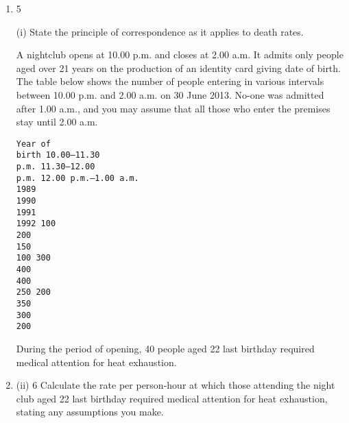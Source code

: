 \documentclass[a4paper,12pt]{article}
\begin{document}
\begin{enumerate}
\item 5

(i)
State the principle of correspondence as it applies to death rates.

\medksip
A nightclub opens at 10.00 p.m. and closes at 2.00 a.m. It admits only people aged
over 21 years on the production of an identity card giving date of birth.
The table below shows the number of people entering in various intervals between
10.00 p.m. and 2.00 a.m. on 30 June 2013. No-one was admitted after 1.00 a.m., and
you may assume that all those who enter the premises stay until 2.00 a.m.
\begin{verbatim}
Year of
birth 10.00–11.30
p.m. 11.30–12.00
p.m. 12.00 p.m.–1.00 a.m.
1989
1990
1991
1992 100
200
150
100 300
400
400
250 200
350
300
200
\end{verbatim}

During the period of opening, 40 people aged 22 last birthday required medical
attention for heat exhaustion.
\item (ii)
6
Calculate the rate per person-hour at which those attending the night club aged
22 last birthday required medical attention for heat exhaustion, stating any
assumptions you make.
\end{enumerate}
\end{document}
